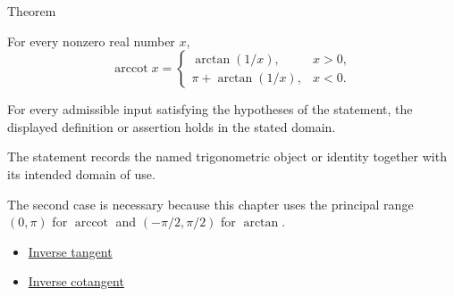 \begin{theorembox}{Theorem}
\begin{theorem}
\label{thm:inverse-cotangent-reciprocal-identity}
For every nonzero real number $x$,
\[
  \operatorname{arccot} x=
  \begin{cases}
    \arctan(1/x), & x>0,\\
    \pi+\arctan(1/x), & x<0.
  \end{cases}
\]
\end{theorem}
\end{theorembox}
\begin{remark*}
For every admissible input satisfying the hypotheses of the statement, the
displayed definition or assertion holds in the stated domain.
\end{remark*}

\begin{remark*}[Interpretation]
The statement records the named trigonometric object or identity together with
its intended domain of use.
\end{remark*}

\begin{remark*}
The second case is necessary because this chapter uses the principal range
$(0,\pi)$ for $\operatorname{arccot}$ and $(-\pi/2,\pi/2)$ for $\arctan$.
\end{remark*}
\begin{dependencies}
\begin{itemize}
  \item \hyperref[def:inverse-tangent]{Inverse tangent}
  \item \hyperref[def:inverse-cotangent]{Inverse cotangent}
\end{itemize}
\end{dependencies}
